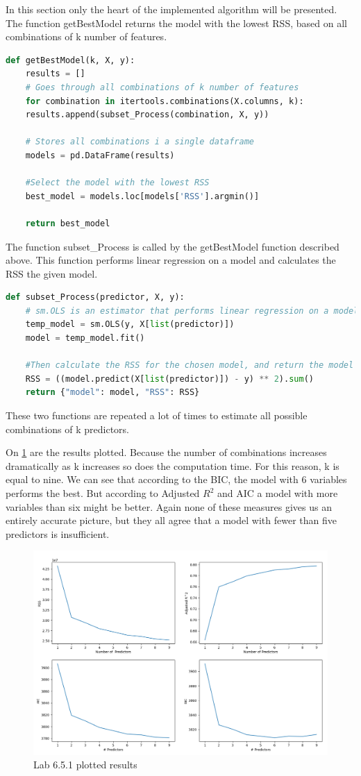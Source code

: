 In this section only the heart of the implemented algorithm will be presented. 
The function getBestModel returns the model with the lowest RSS, based on all combinations of k number of features.

\begin{lstlisting}[language=Python]
def getBestModel(k, X, y):
	results = []
	# Goes through all combinations of k number of features
	for combination in itertools.combinations(X.columns, k):
	results.append(subset_Process(combination, X, y))

	# Stores all combinations i a single dataframe
	models = pd.DataFrame(results)

	#Select the model with the lowest RSS
	best_model = models.loc[models['RSS'].argmin()]

	return best_model

\end{lstlisting}

The function subset\_Process is called by the getBestModel function described above. This function performs linear regression on a model and calculates the RSS the given model.

\begin{lstlisting}[language=Python]
def subset_Process(predictor, X, y):
	# sm.OLS is an estimator that performs linear regression on a model
	temp_model = sm.OLS(y, X[list(predictor)])
	model = temp_model.fit()

	#Then calculate the RSS for the chosen model, and return the model and its RSS together
	RSS = ((model.predict(X[list(predictor)]) - y) ** 2).sum()
	return {"model": model, "RSS": RSS}

\end{lstlisting}

These two functions are repeated a lot of times to estimate all possible combinations of k predictors.

On \cref{fig:Lab_6_5_1_plot} are the results plotted. Because the number of combinations increases dramatically as k increases so does the computation time. For this reason, k is equal to nine. 
We can see that according to the BIC, the model with 6 variables performs the best. But according to Adjusted $R^2$ and AIC a model with more variables than six might be better. Again none of these measures gives us an entirely accurate picture, but they all agree that a model with fewer than five predictors is insufficient.

\begin{figure}[H]
	\centering
	\includegraphics[width=12cm]{Img/Lab_6_5_1_plot.PNG}
	\caption{Lab 6.5.1 plotted results}
	\label{fig:Lab_6_5_1_plot}
\end{figure} 